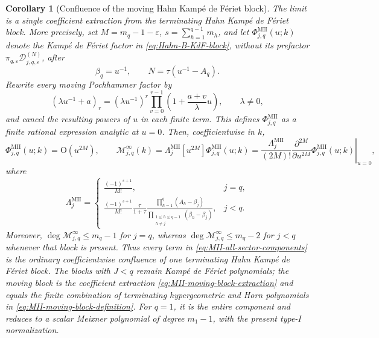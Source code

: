 \documentclass[10pt]{amsart}
\theoremstyle{plain}
\newtheorem{corollary}[theorem]{Corollary}
\theoremstyle{definition}
\theoremstyle{remark}
\begin{document}
\begin{corollary}[Confluence of the moving Hahn Kamp\'e de F\'eriet block]
The limit is a single coefficient extraction from the terminating Hahn
Kamp\'e de F\'eriet block.  More precisely, set
\(M=m_q-1-\varepsilon\), \(s=\sum_{h=1}^{q-1}m_h\), and let
\(\Phi_{j,q}^{\mathrm{MII}}(u;k)\) denote the Kamp\'e de F\'eriet
factor in \eqref{eq:Hahn-B-KdF-block}, without its prefactor
\(\pi_{q,\varepsilon}\mathcal D_{j,q,\varepsilon}^{(N)}\), after
\begin{equation*}
 \beta_q=u^{-1},\qquad N=\tau(u^{-1}-A_q).
\end{equation*}
Rewrite every moving Pochhammer factor by
\[
 (\lambda u^{-1}+a)_r
 =(\lambda u^{-1})^r
  \prod_{v=0}^{r-1}\left(1+\frac{a+v}{\lambda}u\right),
 \qquad \lambda\ne0,
\]
and cancel the resulting powers of \(u\) in each finite term.  This
defines \(\Phi_{j,q}^{\mathrm{MII}}\) as a finite rational expression
analytic at \(u=0\).  Then, coefficientwise in \(k\),
\begin{equation}
 \Phi_{j,q}^{\mathrm{MII}}(u;k)=\mathrm O(u^{2M}),
 \qquad
 \mathscr M_{j,q}^{\infty}(k)
 =\Lambda_j^{\mathrm{MII}}[u^{2M}]
  \Phi_{j,q}^{\mathrm{MII}}(u;k)
 =\frac{\Lambda_j^{\mathrm{MII}}}{(2M)!}
  \left.\frac{\partial^{2M}}{\partial u^{2M}}
  \Phi_{j,q}^{\mathrm{MII}}(u;k)\right|_{u=0},
 \label{eq:MII-moving-block-extraction}
\end{equation}
where
\begin{equation}
 \Lambda_j^{\mathrm{MII}}=
 \begin{cases}
 \displaystyle \frac{(-1)^{s+1}}{M!},&j=q,\\[6pt]
 \displaystyle \frac{(-1)^{s+1}}{M!}\frac{\tau}{1+\tau}
 \frac{\prod_{h=1}^{q}(A_h-\beta_j)}
 {\prod_{\substack{1\le h\le q-1\\h\ne j}}
  (\beta_h-\beta_j)},&j<q.
 \end{cases}
 \label{eq:MII-moving-block-prefactor}
\end{equation}
Moreover,
\(\deg\mathscr M_{j,q}^{\infty}\le m_q-1\) for \(j=q\), whereas
\(\deg\mathscr M_{j,q}^{\infty}\le m_q-2\) for \(j<q\) whenever that
block is present.  Thus every term in
\eqref{eq:MII-all-sector-components} is the ordinary coefficientwise
confluence of one terminating Hahn Kamp\'e de F\'eriet block.  The
blocks with \(J<q\) remain Kamp\'e de F\'eriet polynomials; the moving
block is the coefficient extraction
\eqref{eq:MII-moving-block-extraction} and equals the finite combination
of terminating hypergeometric and Horn polynomials in
\eqref{eq:MII-moving-block-definition}.  For \(q=1\), it is
the entire component and reduces to a scalar Meixner polynomial of
degree \(m_1-1\), with the present type-I normalization.
\end{corollary}
\end{document}
